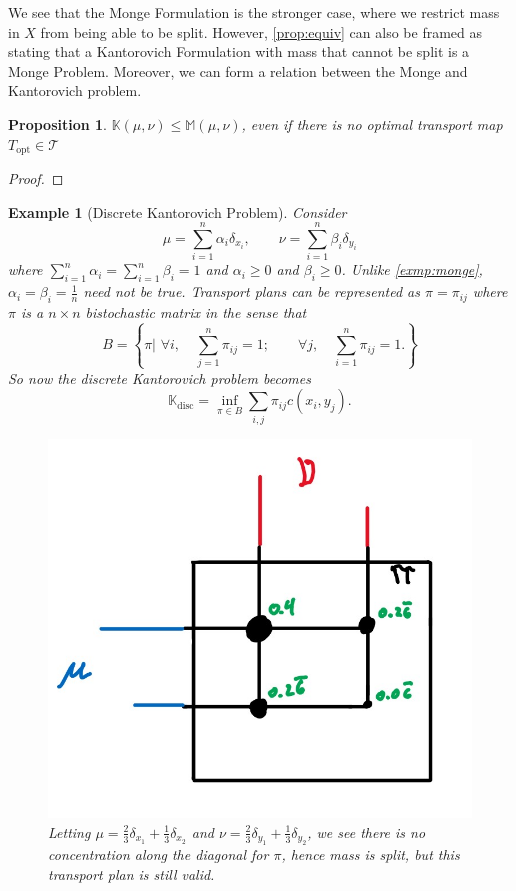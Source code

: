 \documentclass[12pt]{article}
\theoremstyle{plain}
\newtheorem{prop}{Proposition}[section]
\newtheorem{exmp}{Example}[section]
\numberwithin{equation}{section}
\begin{document}
We see that the Monge Formulation is the stronger case, where we restrict mass in $X$ from being able to be split. However, \autoref{prop:equiv} can also be framed as stating that a Kantorovich Formulation with mass
that cannot be split is a Monge Problem. Moreover, we can form a relation between the Monge and Kantorovich problem.
\begin{prop}
  $\mathbb{K}(\mu,\nu) \le \mathbb{M}(\mu,\nu)$, even if there is no optimal transport map $T_{\text{opt}}\in \mathcal{T}$
\end{prop}
\begin{proof}
  
\end{proof}
\begin{exmp}[Discrete Kantorovich Problem] Consider 
  \[\mu = \sum_{i=1}^n\alpha_i\delta_{x_i},\qquad\nu = \sum_{i=1}^n\beta_{i}\delta_{y_i}\] where $\sum_{i=1}^n \alpha_i = \sum_{i=1}^n\beta_i = 1$ and $\alpha_i \ge 0$ and $\beta_i \ge 0$. Unlike \autoref{exmp:monge}, $\alpha_i = \beta_i = \frac{1}{n}$ need not be true. Transport plans can be represented as $\pi = \pi_{ij}$\cite{thorpe} where $\pi$ is a $n\times n$ bistochastic matrix in the sense that
  \[B = \left\{\pi \bigg\vert\,\,\forall i, \quad \sum_{j=1}^n\pi_{ij} = 1;\qquad\forall j,\quad \sum_{i=1}^n\pi_{ij} = 1.\right\}\]
  So now the discrete Kantorovich problem becomes 
  \begin{equation}
    \mathbb{K}_{\text{disc}} = \inf_{\pi\in B}\sum_{i,j}\pi_{ij}c(x_i,y_j).
  \end{equation}
  \begin{figure}[H]
    \center
    \includegraphics[scale=0.3]{discretekant.jpg}
    \caption{Letting $\mu = \frac{2}{3}\delta_{x_1} + \frac{1}{3}\delta_{x_2}$ and $\nu = \frac{2}{3}\delta_{y_1} + \frac{1}{3}\delta_{y_2}$, we see there is no concentration along the diagonal for $\pi$, hence mass is split, but this transport plan is still valid.}
    \label{fig:kant}
  \end{figure}
\end{exmp} 
\end{document}
